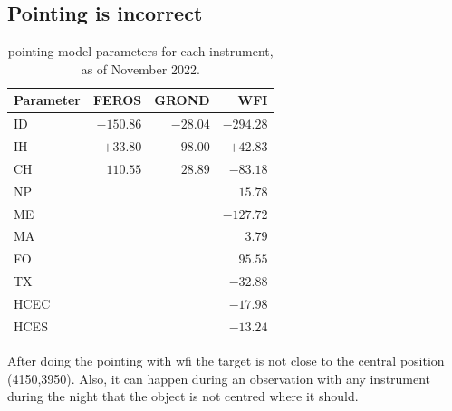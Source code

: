 \documentclass[11pt,fleqn,a4paper]{book}
\begin{document}
\subsection{Pointing is incorrect}
\label{sec:trouble:pointing}
\begin{table}[!bt]
\centering
\caption[Pointing model parameters for each instrument]{\Gls{pointing model} parameters for each instrument, as of November 2022.}
\label{tab:pointingmodelcoeff}
\small
\begin{tabular}{lrrr}
\hline\hline
Parameter & FEROS      & GROND     & WFI\\\hline
ID        & $-150.86$  & $-28.04$ & $-294.28$\\
IH        & $+33.80$  & $-98.00$ & $+42.83$\\
CH        & $ 110.55$  & $28.89$ & $ -83.18$\\\hline
NP        & \multicolumn{3}{r}{$15.78$}\\
ME        & \multicolumn{3}{r}{$-127.72$}\\
MA        & \multicolumn{3}{r}{$3.79$}\\
FO        & \multicolumn{3}{r}{$95.55$}\\
TX        & \multicolumn{3}{r}{$-32.88$}\\
HCEC      & \multicolumn{3}{r}{$-17.98$}\\
HCES      & \multicolumn{3}{r}{$-13.24$}\\\hline
\end{tabular}
\end{table}

After doing the \gls{pointing} with \gls{wfi} the target is not close to the central position (4150,3950).  Also, it can happen during an observation with any instrument during the night that the object is not centred where it should.
\end{document}

